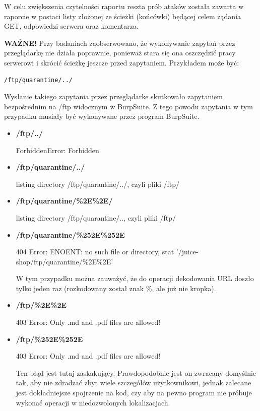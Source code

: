W celu zwiększenia czytelności raportu reszta prób ataków została zawarta w raporcie w postaci listy złożonej ze ścieżki (końcówki) będącej celem żądania GET, odpowiedzi serwera oraz komentarza.

\textbf{WAŻNE!} Przy badaniach zaobserwowano, że wykonywanie zapytań przez przeglądarkę nie działa poprawnie, ponieważ stara się ona oszczędzić pracy serwerowi i skrócić ścieżkę jeszcze przed zapytaniem. Przykładem może być: \begin{lstlisting}
/ftp/quarantine/../ \end{lstlisting} Wysłanie takiego zapytania przez przeglądarke skutkowało zapytaniem bezpośrednim na /ftp widocznym w BurpSuite. Z tego powodu zapytania w tym przypadku musiały być wykonywane przez program BurpSuite.
\begin{itemize}
    \item \textbf{/ftp/../}\vspace{0.5em}
    
    ForbiddenError: Forbidden
    \item \textbf{/ftp/quarantine/../}\vspace{0.5em}
    
    listing directory /ftp/quarantine/../, czyli pliki /ftp/
    \item \textbf{/ftp/quarantine/\%2E\%2E/}\vspace{0.5em}
    
    listing directory /ftp/quarantine/.., czyli pliki /ftp/
    \item \textbf{/ftp/quarantine/\%252E\%252E}\vspace{0.5em}
    
    404 Error: ENOENT: no such file or directory, stat '/juice-shop/ftp/quarantine/\%2E\%2E'\vspace{0.5em}

    W tym przypadku można zauważyć, że do operacji dekodowania URL doszło tylko jeden raz (rozkodowany został znak \%, ale już nie kropka).
    \item \textbf{/ftp/\%2E\%2E}\vspace{0.5em}
    
    403 Error: Only .md and .pdf files are allowed!
    \item \textbf{/ftp/\%252E\%252E}\vspace{0.5em}

    403 Error: Only .md and .pdf files are allowed!\vspace{0.5em}

    Ten błąd jest tutaj zaskakujący. Prawdopodobnie jest on zwracany domyślnie tak, aby nie zdradzać zbyt wiele szczegółów użytkownikowi, jednak zalecane jest dokładniejsze spojrzenie na kod, czy aby na pewno program nie próbuje wykonać operacji w niedozwolonych lokalizacjach.
\end{itemize}

